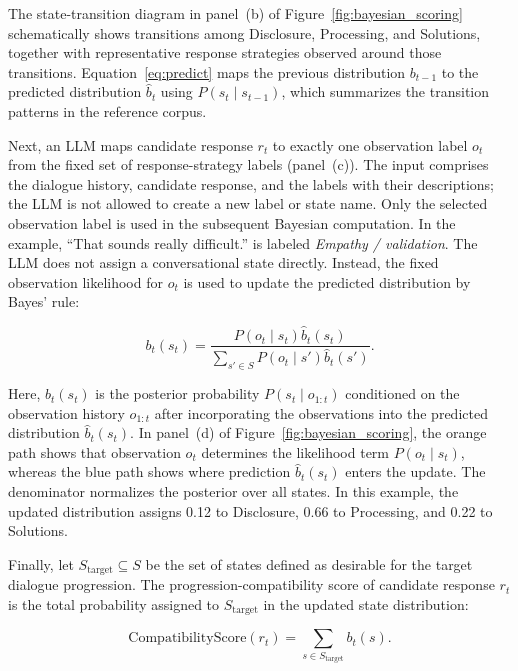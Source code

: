 \documentclass[manuscript,review,anonymous]{acmart}
\begin{document}
The state-transition diagram in panel~(b) of Figure~\ref{fig:bayesian_scoring} schematically shows transitions among Disclosure, Processing, and Solutions, together with representative response strategies observed around those transitions. Equation~\eqref{eq:predict} maps the previous distribution $b_{t-1}$ to the predicted distribution $\hat{b}_t$ using $P(s_t\mid s_{t-1})$, which summarizes the transition patterns in the reference corpus.

Next, an LLM maps candidate response $r_t$ to exactly one observation label $o_t$ from the fixed set of response-strategy labels (panel~(c)). The input comprises the dialogue history, candidate response, and the labels with their descriptions; the LLM is not allowed to create a new label or state name. Only the selected observation label is used in the subsequent Bayesian computation. In the example, ``That sounds really difficult.'' is labeled \emph{Empathy / validation}. The LLM does not assign a conversational state directly. Instead, the fixed observation likelihood for $o_t$ is used to update the predicted distribution by Bayes' rule:

\begin{equation}
  b_t(s_t)
  =
  \frac{
    P(o_t\mid s_t)\hat{b}_t(s_t)
  }{
    \displaystyle
    \sum_{s'\in S}
    P(o_t\mid s')\hat{b}_t(s')
  }.
  \label{eq:update}
\end{equation}

Here, $b_t(s_t)$ is the posterior probability $P(s_t\mid o_{1:t})$ conditioned on the observation history $o_{1:t}$ after incorporating the observations into the predicted distribution $\hat{b}_t(s_t)$. In panel~(d) of Figure~\ref{fig:bayesian_scoring}, the orange path shows that observation $o_t$ determines the likelihood term $P(o_t\mid s_t)$, whereas the blue path shows where prediction $\hat{b}_t(s_t)$ enters the update. The denominator normalizes the posterior over all states. In this example, the updated distribution assigns 0.12 to Disclosure, 0.66 to Processing, and 0.22 to Solutions.

Finally, let $S_{\mathrm{target}}\subseteq S$ be the set of states defined as desirable for the target dialogue progression. The progression-compatibility score of candidate response $r_t$ is the total probability assigned to $S_{\mathrm{target}}$ in the updated state distribution:

\begin{equation}
  \mathrm{CompatibilityScore}(r_t)
  =
  \sum_{s\in S_{\mathrm{target}}}
  b_t(s).
  \label{eq:score}
\end{equation}
\end{document}
